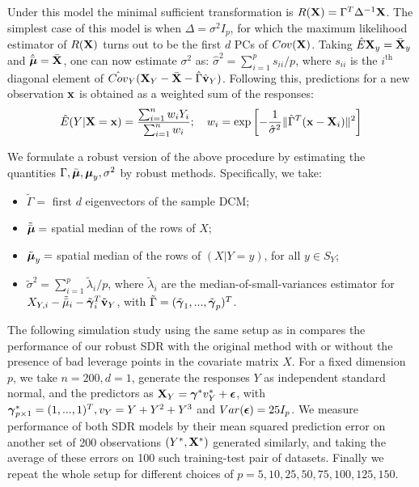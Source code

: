 \documentclass[12pt,letterpaper]{article}
\theoremstyle{definition} \newtheorem{Definition}[Theorem]{Definition}
\begin{document}
Under this model the minimal sufficient transformation is $R({\mathbf{X}}) = \Gamma^T \Delta^{-1} {\mathbf{X}}$. The simplest case of this model is when $\Delta = \sigma^2 I_p$, for which the maximum likelihood estimator of $ R({\mathbf{X}})$ turns out to be the first $d$ PCs of $Cov({\mathbf{X}})$. Taking $\hat E{\mathbf{X}}_y = \bar{{\mathbf{X}}}_y$ and $\hat{\bar{{\boldsymbol{\mu}}}} = \bar{{\mathbf{X}}}$, one can now estimate $\sigma^2$ as: $\hat\sigma^2 = \sum_{i=1}^p s_{ii}/p$, where $s_{ii}$ is the $i^\text{th}$ diagonal element of $\hat{Cov}_Y( {\mathbf{X}}_Y - \bar{{\mathbf{X}}} - \hat\Gamma \hat{{\bf{v}}}_Y)$. Following this, predictions for a new observation ${\bf{x}}$ is obtained as a weighted sum of the responses:
%
$$
\hat E(Y|{\mathbf{X}}={\bf{x}}) = \frac{\sum_{i=1}^n w_i Y_i}{\sum_{i=1}^n w_i}; \quad w_i = \exp \left[ -\frac{1}{\hat\sigma^2}  \| \hat\Gamma^T ({\bf{x}} - {\mathbf{X}}_i) \|^2 \right]
$$
%

We formulate a robust version of the above procedure by estimating the quantities $\Gamma, \bar{{\boldsymbol{\mu}}}, {\boldsymbol{\mu}}_y, \sigma^2$ by robust methods. Specifically, we take:
%
\begin{itemize}
\item $\tilde \Gamma = $ first $d$ eigenvectors of the sample DCM;
%
\item $\tilde{\bar{{\boldsymbol{\mu}}}} = $ spatial median of the rows of $X$;
%
\item $\tilde {{\boldsymbol{\mu}}}_y = $ spatial median of the rows of $(X|Y=y)$, for all $y \in S_Y$;
%
\item $\tilde\sigma^2 = \sum_{i=1}^p \tilde\lambda_i/p$, where $\tilde\lambda_i$ are the median-of-small-variances estimator for $X_{Y,i} - \tilde{\bar\mu}_i - \tilde{{\boldsymbol{\gamma}}}_i^T \tilde{{\bf{v}}}_Y$, with $\tilde\Gamma = (\tilde{{\boldsymbol{\gamma}}}_1, ..., \tilde{{\boldsymbol{\gamma}}}_p)^T$.
\end{itemize}
%
The following simulation study using the same setup as in \citep{AdragniCook09} compares the performance of our robust SDR with the original method with or without the presence of bad leverage points in the covariate matrix $X$. For a fixed dimension $p$, we take $n=200, d=1$, generate the responses $Y$ as independent standard normal, and the predictors as ${\mathbf{X}}_Y = {\boldsymbol{\gamma}}^* v_Y^* + {\boldsymbol{\epsilon}}$, with ${\boldsymbol{\gamma}}^*_{p\times 1} = (1,...,1)^T, v_Y = Y + Y^2 + Y^3$ and $Var({\boldsymbol{\epsilon}}) = 25 I_p$. We measure performance of both SDR models by their mean squared prediction error on another set of 200 observations $(Y^*, {\mathbf{X}}^*)$ generated similarly, and taking the average of these errors on 100 such training-test pair of datasets. Finally we repeat the whole setup for different choices of $p = 5,10,25,50,75,100,125,150$.
\end{document}
